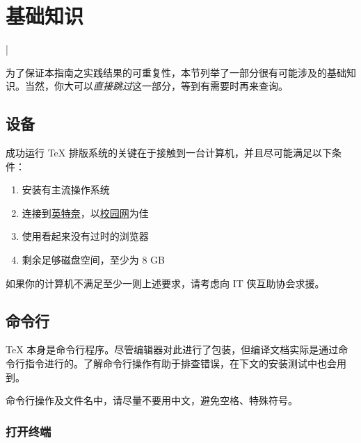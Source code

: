 \section{基础知识}
\label{sec:intro}

\lstMakeShortInline[
  style=kaolst,
  language=bash,
  columns=fixed]|

\begin{widepar}
为了保证本指南之实践结果的可重复性，本节列举了一部分很有可能涉及的基础知识。当然，你大可以\emph{直接跳过}这一部分，等到有需要时再来查询。
\end{widepar}

\subsection{设备}

成功运行 \TeX{} 排版系统的关键在于接触到一台计算机，并且尽可能满足以下条件：

\begin{enumerate}
  \item 安装有主流操作系统
  \item 连接到\href{https://www.bilibili.com/video/BV1vW411Y7oh}{英特奈}，以\href{https://p.nju.edu.cn}{校园网}为佳
  \item 使用看起来没有过时的浏览器
  \item 剩余足够磁盘空间，至少为 8 GB
\end{enumerate}

如果你的计算机不满足至少一则上述要求，请考虑向 IT 侠互助协会求援。

\subsection{命令行}

\TeX{} 本身是命令行程序。尽管编辑器对此进行了包装，但编译文档实际是通过命令行指令进行的。了解命令行操作有助于排查错误，在下文的安装测试中也会用到。

命令行操作及文件名中，请尽量不要用中文，避免空格、特殊符号。

\subsubsection{打开终端}

